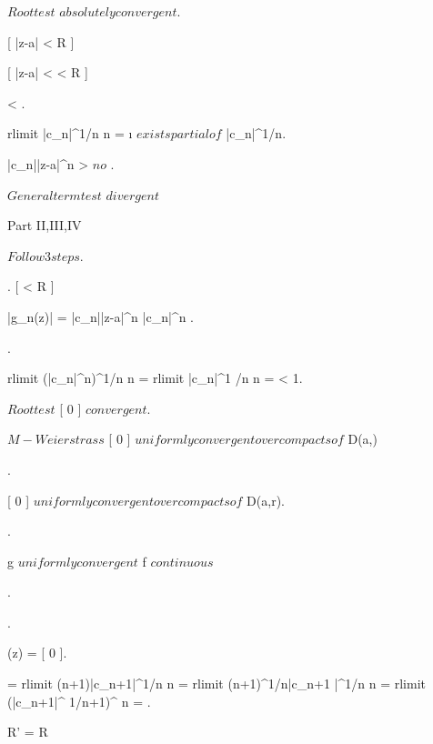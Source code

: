\documentclass[../Main/main]{subfiles}
\begin{document}
{{{{			 	$ Root test $ \imp $ absolutely convergent $.

			 }

			 [ |z-a| < R ]
			 {
			 	\all{ \rho \in \R }[ |z-a| < \rho < R ]
			 	{
			 		 < .

			 		rlimit{ |c_n|^{1/n} }{ n } =  \i
			 		$ exists partial of $ |c_n|^{1/n}.

			 		|c_n||z-a|^n >  $ no $ .

			 		$ General term test $ \imp $ divergent $
			 	}
			}
		}
		
	}


	{
		{
			
		}
		\holds
		{
			Part II,III,IV
		}
		\demonstration
		{
			$ Follow 3 steps $.
			
			{
				.
				\all{ \rho \in \R }[ \rho < R ]
				{
					\all{ z \in \closed{D(a,\rho)} }
					{
						|g_n(z)| = |c_n||z-a|^n \leq |c_n|\rho^n
					}.

					.

					rlimit{ (|c_n|\rho^n)^{1/n} }{ n } = \rho rlimit{ |c_n|^{1
	/n} }{ n } =  < 1.
	

					$Root test$ \imp {}[ 0 ] $ convergent $.

					$M-Weierstrass$ \imp {}[ 0 ] $ uniformly convergent over compacts of $ D(a,\rho)
				}.

				[ 0 ] $ uniformly convergent over compacts of $ D(a,r).

				.

				g $ uniformly convergent $ \imp f $ continuous $
			}.
			
			{
				.

				(z) = [ 0 ].

				 = rlimit{ (n+1)|c_{n+1}|^{1/n} }{ n } = rlimit{ (n+1)^{1/n}|c_{n+1
}|^{1/n} }{ n } = rlimit{ (|c_{n+1}|^{
1/n+1})^{} }{ n } = .

				R' = R

			}

}}}
\end{document}
